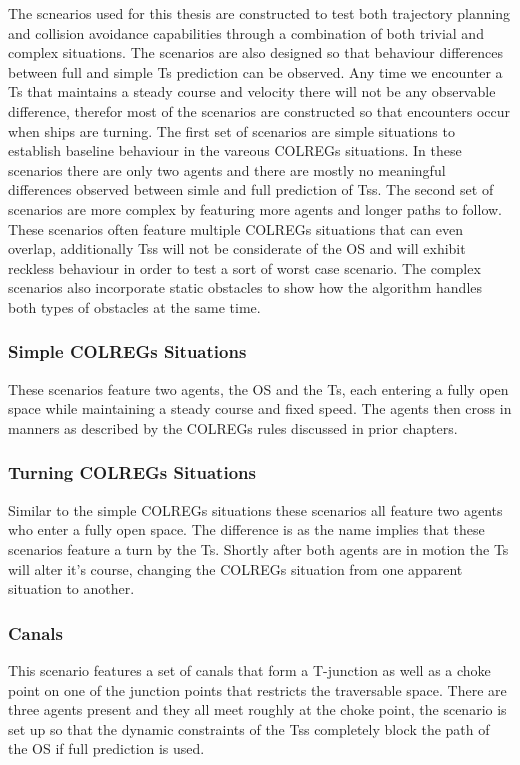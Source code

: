\fi

The scnearios used for this thesis are constructed to test both trajectory planning and collision avoidance capabilities through
a combination of both trivial and complex situations. The scenarios are also designed so that behaviour differences between
full and simple \gls{Ts} prediction can be observed. Any time we encounter a \gls{Ts} that maintains a steady course and
velocity there will not be any observable difference, therefor most of the scenarios are constructed so that encounters occur
when ships are turning.
The first set of scenarios are simple situations to establish baseline behaviour in the vareous \gls{COLREGs} situations. In these scenarios there are only 
two agents and there are mostly no meaningful differences observed between simle and full prediction of \gls{Ts}s. 
The second set of scenarios are more complex by featuring more agents and longer paths to follow. These scenarios often feature multiple \gls{COLREGs} situations that can
even overlap, additionally \gls{Ts}s will not be considerate of the \gls{OS} and will exhibit reckless behaviour in order to test a sort of worst case scenario.
The complex scenarios also incorporate static obstacles to show how the algorithm handles both types of obstacles at the same time.

\subsubsection*{Simple COLREGs Situations}
These scenarios feature two agents, the \gls{OS} and the \gls{Ts}, each entering a fully open space while maintaining a
steady course and fixed speed. The agents then cross in manners as described by the \gls{COLREGs} rules discussed in prior chapters.


\subsubsection*{Turning COLREGs Situations}
Similar to the simple \gls{COLREGs} situations these scenarios all feature two agents who enter a fully open space. The difference
is as the name implies that these scenarios feature a turn by the \gls{Ts}. Shortly after both agents are in motion the \gls{Ts}
will alter it's course, changing the COLREGs situation from one apparent situation to another.

\subsubsection*{Canals}
This scenario features a set of canals that form a T-junction as well as a choke point on one of the junction points that restricts
the traversable space. There are three agents present and they all meet roughly at the choke point, the scenario is set up so that
the dynamic constraints of the \gls{Ts}s completely block the path of the \gls{OS} if full prediction is used.

